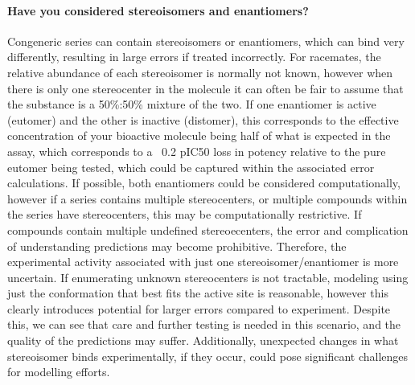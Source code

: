\documentclass[9pt,bestpractices]{livecoms}
\begin{document}
\paragraph{Have you considered stereoisomers and enantiomers?}
Congeneric series can contain stereoisomers or enantiomers, which can bind very differently, resulting in large errors if treated incorrectly. For racemates, the relative abundance of each stereoisomer is normally not known, however when there is only one stereocenter in the molecule it can often be fair to assume that the substance is a 50\%:50\% mixture of the two. If one enantiomer is active (eutomer) and the other is inactive (distomer), this corresponds to the effective concentration of your bioactive molecule being half of what is expected in the assay, which corresponds to a ~0.2 pIC50 loss in potency relative to the pure eutomer being tested, which could be captured within the associated error calculations.\cite{h2011significance} If possible, both enantiomers could be considered computationally, however if a series contains multiple stereocenters, or multiple compounds within the series have stereocenters, this may be computationally restrictive. If compounds contain multiple undefined stereoecenters, the error and complication of understanding predictions may become prohibitive. Therefore, the experimental activity associated with just one stereoisomer/enantiomer is more uncertain. If enumerating unknown stereocenters is not tractable, modeling using just the conformation that best fits the active site is reasonable, however this clearly introduces potential for larger errors compared to experiment. Despite this, we can see that care and further testing is needed in this scenario, and the quality of the predictions may suffer. Additionally, unexpected changes in what stereoisomer binds experimentally, if they occur, could pose significant challenges for modelling efforts.
\end{document}
